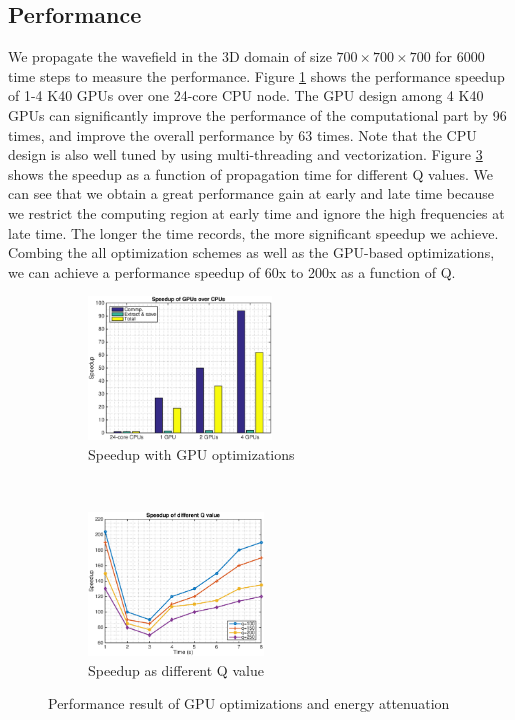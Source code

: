 \documentclass{paris17}
\begin{document}
\subsection{Performance}

We propagate the wavefield in the 3D domain of size $700\times700\times700$ for 6000 time steps to measure the performance. Figure \ref{fig:gpu-speedup} shows the performance speedup of 1-4 K40 GPUs over one 24-core CPU node. The GPU design among 4 K40 GPUs can significantly improve the performance of the computational part by 96 times, and improve the overall performance by 63 times. Note that the CPU design is also well tuned by using multi-threading and vectorization. Figure \ref{fig:q-speedup} shows the speedup as a function of propagation time for different Q values. We can see that we obtain a great performance gain at early and late time because we restrict the computing region at early time and ignore the high frequencies at late time. The longer the time records, the more significant speedup we achieve.  Combing the all optimization schemes as well as the GPU-based optimizations, we can achieve a performance speedup of 60x to 200x as a function of Q.

\begin{figure}[h]
    \centering
    \begin{subfigure}[b]{0.4\textwidth}
        \centering
        \includegraphics[height=1.5in]{./fig/speedup.eps}
        \caption{Speedup with GPU optimizations}
        \label{fig:gpu-speedup}
    \end{subfigure}%
    ~
    \begin{subfigure}[b]{0.4\textwidth}
        \centering
        \includegraphics[height=1.5in]{./fig/speedup_q.eps}
        \caption{Speedup as different Q value}
        \label{fig:q-speedup}
    \end{subfigure}
    \caption{Performance result of GPU optimizations and energy attenuation}
\end{figure}
\end{document}
